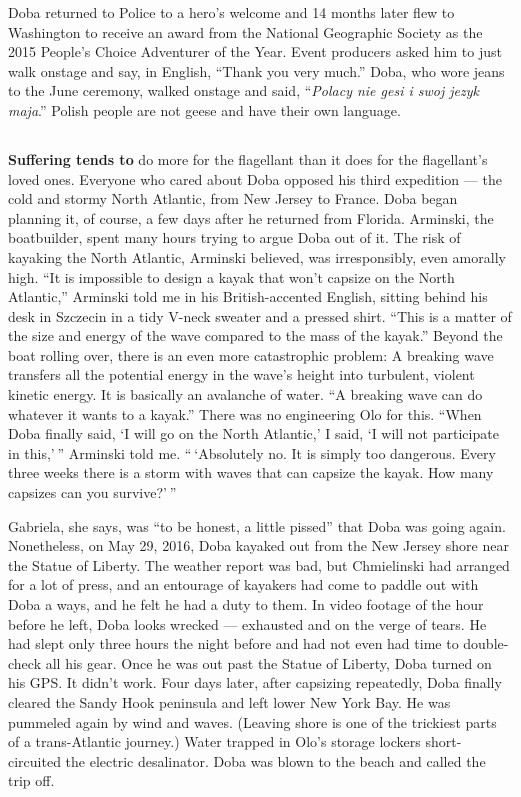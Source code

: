 Doba returned to Police to a hero's welcome and 14 months later flew to
Washington to receive an award from the National Geographic Society as
the 2015 People's Choice Adventurer of the Year. Event producers asked
him to just walk onstage and say, in English, ``Thank you very much.''
Doba, who wore jeans to the June ceremony, walked onstage and said,
``\emph{Polacy nie gesi i swoj jezyk maja}.'' Polish people are not
geese and have their own language.

\hypertarget{-3}{%
\subsection{}\label{-3}}

\textbf{Suffering tends to} do more for the flagellant than it does for
the flagellant's loved ones. Everyone who cared about Doba opposed his
third expedition --- the cold and stormy North Atlantic, from New Jersey
to France. Doba began planning it, of course, a few days after he
returned from Florida. Arminski, the boatbuilder, spent many hours
trying to argue Doba out of it. The risk of kayaking the North Atlantic,
Arminski believed, was irresponsibly, even amorally high. ``It is
impossible to design a kayak that won't capsize on the North Atlantic,''
Arminski told me in his British-accented English, sitting behind his
desk in Szczecin in a tidy V-neck sweater and a pressed shirt. ``This is
a matter of the size and energy of the wave compared to the mass of the
kayak.'' Beyond the boat rolling over, there is an even more
catastrophic problem: A breaking wave transfers all the potential energy
in the wave's height into turbulent, violent kinetic energy. It is
basically an avalanche of water. ``A breaking wave can do whatever it
wants to a kayak.'' There was no engineering Olo for this. ``When Doba
finally said, `I will go on the North Atlantic,' I said, `I will not
participate in this,' '' Arminski told me. `` `Absolutely no. It is
simply too dangerous. Every three weeks there is a storm with waves that
can capsize the kayak. How many capsizes can you survive?' ''

Gabriela, she says, was ``to be honest, a little pissed'' that Doba was
going again. Nonetheless, on May 29, 2016, Doba kayaked out from the New
Jersey shore near the Statue of Liberty. The weather report was bad, but
Chmielinski had arranged for a lot of press, and an entourage of
kayakers had come to paddle out with Doba a ways, and he felt he had a
duty to them. In video footage of the hour before he left, Doba looks
wrecked --- exhausted and on the verge of tears. He had slept only three
hours the night before and had not even had time to double-check all his
gear. Once he was out past the Statue of Liberty, Doba turned on his
GPS. It didn't work. Four days later, after capsizing repeatedly, Doba
finally cleared the Sandy Hook peninsula and left lower New York Bay. He
was pummeled again by wind and waves. (Leaving shore is one of the
trickiest parts of a trans-Atlantic journey.) Water trapped in Olo's
storage lockers short-circuited the electric desalinator. Doba was blown
to the beach and called the trip off.

